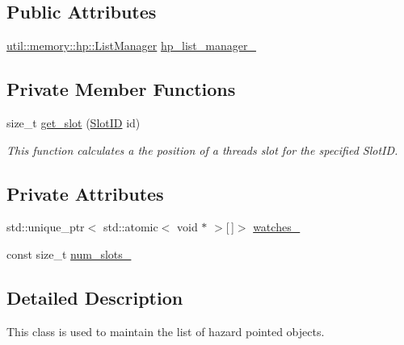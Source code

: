 \subsection*{Public Attributes}
\begin{DoxyCompactItemize}
\item 
\hyperlink{classtervel_1_1util_1_1memory_1_1hp_1_1_list_manager}{util\+::memory\+::hp\+::\+List\+Manager} \hyperlink{classtervel_1_1util_1_1memory_1_1hp_1_1_hazard_pointer_a1a383a62d826608c66e33718e1efa523}{hp\+\_\+list\+\_\+manager\+\_\+}
\end{DoxyCompactItemize}
\subsection*{Private Member Functions}
\begin{DoxyCompactItemize}
\item 
size\+\_\+t \hyperlink{classtervel_1_1util_1_1memory_1_1hp_1_1_hazard_pointer_ae45134e1defa344a7cf642ea3dac29e2}{get\+\_\+slot} (\hyperlink{classtervel_1_1util_1_1memory_1_1hp_1_1_hazard_pointer_a390f6869150121a40b300b955198b897}{Slot\+I\+D} id)
\begin{DoxyCompactList}\small\item\em This function calculates a the position of a threads slot for the specified Slot\+I\+D. \end{DoxyCompactList}\end{DoxyCompactItemize}
\subsection*{Private Attributes}
\begin{DoxyCompactItemize}
\item 
std\+::unique\+\_\+ptr$<$ std\+::atomic$<$ void $\ast$ $>$\mbox{[}$\,$\mbox{]}$>$ \hyperlink{classtervel_1_1util_1_1memory_1_1hp_1_1_hazard_pointer_abfd4c49d7092b4114b65f763d748c939}{watches\+\_\+}
\item 
const size\+\_\+t \hyperlink{classtervel_1_1util_1_1memory_1_1hp_1_1_hazard_pointer_ae43516037d461753c977ec58eb545760}{num\+\_\+slots\+\_\+}
\end{DoxyCompactItemize}


\subsection{Detailed Description}
This class is used to maintain the list of hazard pointed objects. 


